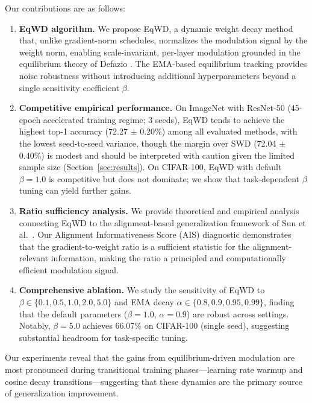 \documentclass{article}
\begin{document}
Our contributions are as follows:

\begin{enumerate}
\item
  \textbf{EqWD algorithm.} We propose EqWD, a dynamic weight decay
  method that, unlike gradient-norm schedules, normalizes the modulation
  signal by the weight norm, enabling scale-invariant, per-layer
  modulation grounded in the equilibrium theory of Defazio
  \citep{defazio2025}. The EMA-based equilibrium tracking provides noise
  robustness without introducing additional hyperparameters beyond a
  single sensitivity coefficient $\beta$.
\item
  \textbf{Competitive empirical performance.} On ImageNet with ResNet-50
  (45-epoch accelerated training regime; 3 seeds), EqWD tends to achieve
  the highest top-1 accuracy (72.27 $\pm$ 0.20\%) among all evaluated
  methods, with the lowest seed-to-seed variance, though the margin over
  SWD (72.04 $\pm$ 0.40\%) is modest and should be interpreted with
  caution given the limited sample size (Section~\ref{sec:results}). On CIFAR-100,
  EqWD with default $\beta = 1.0$ is competitive but does not
  dominate; we show that task-dependent $\beta$ tuning can yield
  further gains.
\item
  \textbf{Ratio sufficiency analysis.} We provide theoretical and
  empirical analysis connecting EqWD to the alignment-based
  generalization framework of Sun et al.~\citep{sun2025cvpr}. Our
  Alignment Informativeness Score (AIS) diagnostic demonstrates that the
  gradient-to-weight ratio is a sufficient statistic for the
  alignment-relevant information, making the ratio a principled and
  computationally efficient modulation signal.
\item
  \textbf{Comprehensive ablation.} We study the sensitivity of EqWD to
  $\beta \in \{0.1, 0.5, 1.0, 2.0, 5.0\}$ and EMA decay
  $\alpha \in \{0.8, 0.9, 0.95, 0.99\}$, finding that the default
  parameters ($\beta = 1.0$, $\alpha = 0.9$) are robust across
  settings. Notably, $\beta = 5.0$ achieves 66.07\% on CIFAR-100
  (single seed), suggesting substantial headroom for task-specific
  tuning.
\end{enumerate}

Our experiments reveal that the gains from equilibrium-driven modulation
are most pronounced during transitional training phases---learning rate
warmup and cosine decay transitions---suggesting that these dynamics are
the primary source of generalization improvement.


\end{document}
